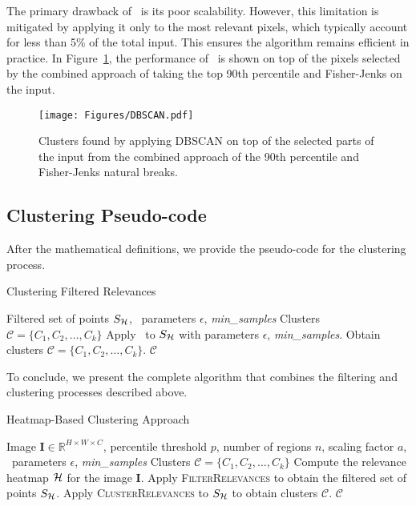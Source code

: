 The primary drawback of \DBSCAN\ is its poor scalability. However, this limitation is mitigated by applying it only to the most relevant pixels, which typically account for less than 5\% of the total input. This ensures the algorithm remains efficient in practice. In Figure~\ref{Fig:DBSCAN}, the performance of \DBSCAN\ is shown on top of the pixels selected by the combined approach of taking the top 90th percentile and Fisher-Jenks on the input.

\begin{figure}[ht!]
	\begin{center}
		\texttt{[image: Figures/DBSCAN.pdf]}
	\end{center}
	\caption{Clusters found by applying DBSCAN on top of the selected parts of the input from the combined approach of the 90th percentile and Fisher-Jenks natural breaks.}
	\label{Fig:DBSCAN}
\end{figure}
\subsection{Clustering Pseudo-code}

After the mathematical definitions, we provide the pseudo-code for the clustering process.

\begin{algorithm}[H]
\caption{Clustering Filtered Relevances}
\begin{algorithmic}[1]
\Require Filtered set of points \( S_{\mathcal{H}} \), \DBSCAN\ parameters \( \epsilon \), \textit{min\_samples}
\Ensure Clusters \( \mathcal{C} = \{ C_1, C_2, \dots, C_k \} \)
    \State Apply \DBSCAN\ to \( S_{\mathcal{H}} \) with parameters \( \epsilon \), \textit{min\_samples}.
    \State Obtain clusters \( \mathcal{C} = \{ C_1, C_2, \dots, C_k \} \).
    \State \Return \( \mathcal{C} \)
\EndProcedure
\end{algorithmic}
\end{algorithm}


To conclude, we present the complete algorithm that combines the filtering and clustering processes described above.

\begin{algorithm}[H]
\caption{Heatmap-Based Clustering Approach}
\begin{algorithmic}[1]
\Require Image \( \mathbf{I} \in \mathbb{R}^{H \times W \times C} \), percentile threshold \( p \), number of regions \( n \), scaling factor \( a \), \DBSCAN\ parameters \( \epsilon \), \textit{min\_samples}
\Ensure Clusters \( \mathcal{C} = \{ C_1, C_2, \dots, C_k \} \)
    \State Compute the relevance heatmap \( \mathcal{H} \) for the image \( \mathbf{I} \).
    \State Apply \textsc{FilterRelevances} to obtain the filtered set of points \( S_{\mathcal{H}} \).
    \State Apply \textsc{ClusterRelevances} to \( S_{\mathcal{H}} \) to obtain clusters \( \mathcal{C} \).
    \State \Return \( \mathcal{C} \)
\EndProcedure
\end{algorithmic}
\end{algorithm}

